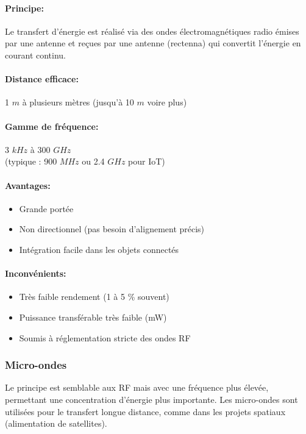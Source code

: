 \documentclass[12pt,a4paper,titlepage,notitlepage]{article}
\begin{document}
	\paragraph{Principe: \\}
	Le transfert d’énergie est réalisé via des ondes électromagnétiques radio émises par une antenne et reçues par une antenne (rectenna) qui convertit l’énergie en courant continu.
	\paragraph{Distance efficace: \\}
	1 $m$ à plusieurs mètres (jusqu’à 10 $m$ voire plus)
	\paragraph{Gamme de fréquence: \\}
	3 $kHz$ à 300 $GHz$ \\ (typique : 900 $MHz$ ou 2.4 $GHz$ pour IoT)
	\paragraph{Avantages: }
	\begin{itemize}
		\item Grande portée
		\item Non directionnel (pas besoin d’alignement précis)
		\item Intégration facile dans les objets connectés
	\end{itemize}
	\paragraph{Inconvénients: }
	\begin{itemize}
		\item Très faible rendement (1 à 5 \% souvent)
		\item Puissance transférable très faible (mW)
		\item Soumis à réglementation stricte des ondes RF
	\end{itemize}

	\subsubsection{Micro-ondes}
	Le principe est semblable aux RF mais avec une fréquence plus élevée, permettant une concentration d’énergie plus importante. Les micro-ondes sont utilisées pour le transfert longue distance, comme dans les projets spatiaux (alimentation de satellites).
\end{document}
